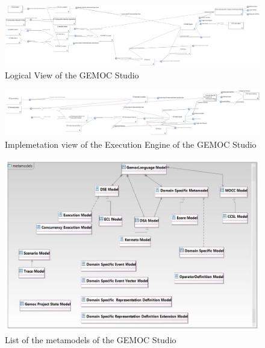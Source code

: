 \documentclass{gemoc} %
\begin{document}
\begin{figure}[htp]
	\begin{center}
	\includegraphics*[trim=0.0cm 0.0cm 0cm 0.0cm, clip=true, angle=90, totalheight=0.9\textheight]{../images/generated/Logical View.png}
	\caption{Logical View of the GEMOC Studio}
	\label{fig:LogicalView}
	\end{center}
\end{figure}
\begin{figure}[htp]
	\begin{center}
	\includegraphics*[trim=0.0cm 0.0cm 0cm 0.0cm, clip=true, angle=90, totalheight=0.9\textheight]{../images/generated/Timesquare Implementation.png}
	\caption{Implemetation view of the Execution Engine of the GEMOC Studio}
	\label{fig:TimesquareImplementation}
	\end{center}
\end{figure}
\begin{figure}[htp]
	\begin{center}
	\includegraphics*[trim=0.0cm 0.0cm 0cm 0.0cm, clip=true, width=1.0\linewidth]{../images/Gemoc Metamodels Class Diagram.jpg}
	\caption{List of the metamodels of the GEMOC Studio}
	\label{fig:MetamodelList}
	\end{center}
\end{figure}
\end{document}
